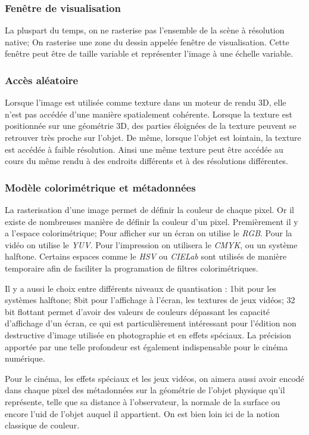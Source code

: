 			\subsubsection{Fenêtre de visualisation}
				La pluspart du temps, on ne rasterise pas l'ensemble de la scène à résolution native; On rasterise une zone du dessin
				appelée fenêtre de visualisation. Cette fenêtre peut être de taille variable et représenter l'image à une échelle variable.

			\subsubsection{Accès aléatoire}
				Lorsque l'image est utilisée comme texture dans un moteur de rendu 3D, elle n'est pas accédée d'une manière spatialement
				cohérente. Lorsque la texture est positionnée sur une géométrie 3D, des parties éloignées de la texture peuvent se retrouver
				très proche sur l'objet. De même, lorsque l'objet est lointain, la texture est accédée à faible résolution. Ainsi une même
				texture peut être accédée au cours du même rendu à des endroits différents et à des résolutions différentes. 

			\subsubsection{Modèle colorimétrique et métadonnées}
				La rasterisation d'une image permet de définir la couleur de chaque pixel. Or il existe de nombreuses manière de définir la
				couleur d'un pixel. Premièrement il y a l'espace colorimétrique; Pour afficher sur un écran on utilise le \emph{RGB}. Pour la
				vidéo on utilise le \emph{YUV}. Pour l'impression on utilisera le \emph{CMYK}, ou un système halftone. Certains espaces comme
				le \emph{HSV} ou \emph{CIELab} sont utilisés de manière temporaire afin de faciliter la programation de filtres colorimétriques.
				
				Il y a aussi le choix entre différents niveaux de quantisation : 1bit pour les systèmes halftone; 8bit pour l'affichage 
				à l'écran,  les textures de jeux vidéos; 32 bit flottant permet d'avoir des valeurs de couleurs dépassant les capacité d'affichage
				d'un écran, ce qui est particulièrement intéressant pour l'édition non destructive d'image utilisée en photographie et en 
				effets spéciaux. La précision apportée par une telle profondeur est également indispensable pour le cinéma numérique.  

				Pour le cinéma, les effets spéciaux et les jeux vidéos, on aimera aussi avoir encodé dans chaque pixel des métadonnées 
				sur la géométrie de l'objet physique qu'il représente, telle que sa distance à l'observateur, la normale de la surface
				ou encore l'uid de l'objet auquel il appartient. On est bien loin ici de la notion classique de couleur. 
				
